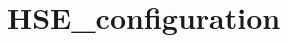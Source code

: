 \hypertarget{group___h_s_e__configuration}{\section{H\-S\-E\-\_\-configuration}
\label{group___h_s_e__configuration}
}

